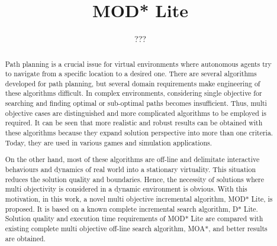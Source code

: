 \documentclass[10pt,journal]{IEEEtran}
\begin{document}
\title{MOD* Lite}

\author{???}

\maketitle

\begin{abstract}
Path planning is a crucial issue for virtual environments where autonomous agents try to navigate from a specific location to a desired one. There are several algorithms developed for path planning, but several domain requirements make engineering of these algorithms difficult. In complex environments, considering single objective for searching and finding optimal or sub-optimal paths becomes insufficient. Thus, multi objective cases are distinguished and more complicated algorithms to be employed is required. It can be seen that more realistic and robust results can be obtained with these algorithms because they expand solution perspective into more than one criteria. Today, they are used in various games and simulation applications.

On the other hand, most of these algorithms are off-line  and delimitate interactive behaviours and dynamics of real world into a stationary virtuality. This situation reduces the solution quality and boundaries. Hence, the necessity of solutions where multi objectivity is considered in a dynamic environment is obvious. With this motivation, in this work, a novel multi objective incremental algorithm, MOD* Lite, is proposed. It is  based on a known complete incremental search algorithm, D* Lite. Solution quality and execution time requirements of MOD* Lite are compared with existing complete multi objective off-line search algorithm, MOA*, and better results are obtained.
\end{abstract}











{}

\end{document}
